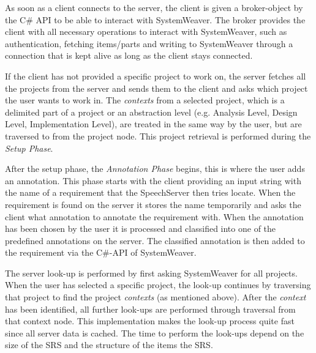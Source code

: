 \documentclass[conference]{IEEEtran}
\begin{document}
As soon as a client connects to the server, the client is given a broker-object by the C\# API to be able to interact with SystemWeaver. 
The broker provides the client with all necessary operations to interact with SystemWeaver, such as authentication, fetching items/parts and writing to SystemWeaver through a connection that is kept alive as long as the client stays connected. 

If the client has not provided a specific project to work on, the server fetches all the projects from the server and sends them to the client and asks which project the user wants to work in. 
The \emph{contexts} from a selected project, which is a delimited part of a project or an abstraction level (e.g. Analysis Level, Design Level, Implementation Level), are treated in the same way by the user, but are traversed to from the project node. 
This project retrieval is performed during the \emph{Setup Phase}. %


After the setup phase, the \emph{Annotation Phase} begins, this is where the user adds an annotation. 
This phase starts with the client providing an input  string with the name of a requirement that the SpeechServer then tries locate. 
When the requirement is found on the server it stores the name temporarily and asks the client what annotation to annotate the requirement with. 
When the annotation has been chosen by the user it is processed and classified into one of the predefined annotations on the server.
The classified annotation is then added to the requirement via the C\#-API of SystemWeaver. 

The server look-up is performed by first asking SystemWeaver for all projects. 
When the user has selected a specific project, the look-up continues by traversing that project to find the project \emph{contexts} (as mentioned above).
After the \emph{context} has been identified, all further look-ups are performed through traversal from that context node. 
This implementation makes the look-up process quite fast since all server data is cached.
The time to perform the look-ups depend on the size of the SRS and the structure of the items the SRS.
\end{document}
